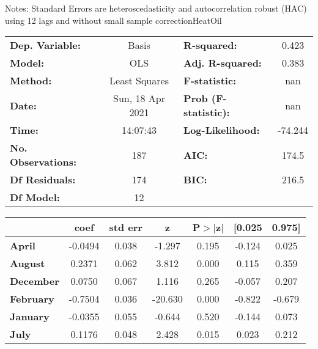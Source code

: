 Notes: \newline
 [1] Standard Errors are heteroscedasticity and autocorrelation robust (HAC) using 12 lags and without small sample correctionHeatOil\begin{center}
\begin{tabular}{lclc}
\toprule
\textbf{Dep. Variable:}    &      Basis       & \textbf{  R-squared:         } &     0.423   \\
\textbf{Model:}            &       OLS        & \textbf{  Adj. R-squared:    } &     0.383   \\
\textbf{Method:}           &  Least Squares   & \textbf{  F-statistic:       } &       nan   \\
\textbf{Date:}             & Sun, 18 Apr 2021 & \textbf{  Prob (F-statistic):} &      nan    \\
\textbf{Time:}             &     14:07:43     & \textbf{  Log-Likelihood:    } &   -74.244   \\
\textbf{No. Observations:} &         187      & \textbf{  AIC:               } &     174.5   \\
\textbf{Df Residuals:}     &         174      & \textbf{  BIC:               } &     216.5   \\
\textbf{Df Model:}         &          12      & \textbf{                     } &             \\
\bottomrule
\end{tabular}
\begin{tabular}{lcccccc}
                   & \textbf{coef} & \textbf{std err} & \textbf{z} & \textbf{P$> |$z$|$} & \textbf{[0.025} & \textbf{0.975]}  \\
\midrule
\textbf{April}     &      -0.0494  &        0.038     &    -1.297  &         0.195        &       -0.124    &        0.025     \\
\textbf{August}    &       0.2371  &        0.062     &     3.812  &         0.000        &        0.115    &        0.359     \\
\textbf{December}  &       0.0750  &        0.067     &     1.116  &         0.265        &       -0.057    &        0.207     \\
\textbf{February}  &      -0.7504  &        0.036     &   -20.630  &         0.000        &       -0.822    &       -0.679     \\
\textbf{January}   &      -0.0355  &        0.055     &    -0.644  &         0.520        &       -0.144    &        0.073     \\
\textbf{July}      &       0.1176  &        0.048     &     2.428  &         0.015        &        0.023    &        0.212     \\

\end{tabular}
\end{center}
